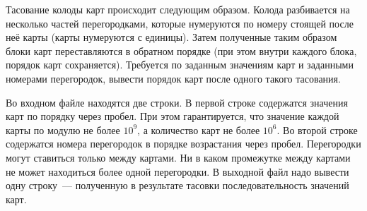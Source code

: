 Тасование колоды карт происходит следующим образом. Колода разбивается на несколько частей перегородками,
которые нумеруются по номеру стоящей после неё карты (карты нумеруются с единицы). Затем полученные таким образом блоки карт переставляются в обратном порядке
(при этом внутри каждого блока, порядок карт сохраняется).
Требуется по заданным значениям карт и заданными номерами перегородок,
вывести порядок карт после одного такого тасования.

\InputFile
Во входном файле находятся две строки. В первой строке содержатся значения карт по порядку через пробел. При этом гарантируется, что значение каждой карты
 по модулю не более $10^9$, а количество карт не более $10^6$.
Во второй строке содержатся номера перегородок в порядке возрастания через пробел. Перегородки могут ставиться только между картами. Ни в каком
 промежутке между картами не может находиться более одной перегородки.
\OutputFile
В выходной файл надо вывести одну строку~--- полученную в результате тасовки последовательность значений карт.
